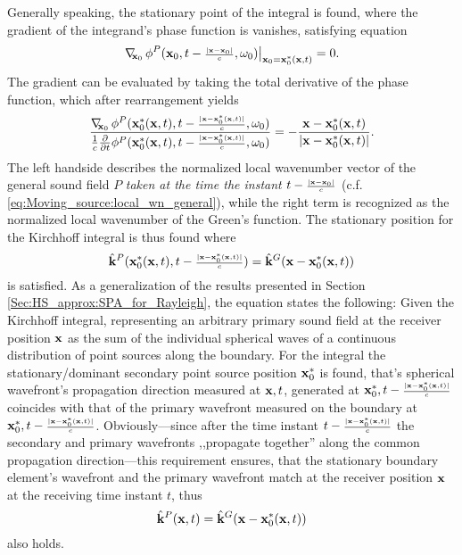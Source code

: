 Generally speaking, the stationary point of the integral is found, where the gradient of the integrand's phase function is vanishes, satisfying equation
\begin{equation}
\left. \nabla_{\!\!\mathbf{x}_0}\, \phi^P(\mathbf{x}_0,t-{\scriptstyle \frac{|\mathbf{x}-\mathbf{x}_0|}{c} },\omega_0) \right|_{\mathbf{x}_0 = \mathbf{x}_0^*(\mathbf{x},t)} = 0.
\end{equation} 
The gradient can be evaluated by taking the total derivative of the phase function, which after rearrangement yields
\begin{equation}
\frac{\nabla_{\!\!\mathbf{x}_0}\, \phi^P(\mathbf{x}_0^*(\mathbf{x},t),t-{\scriptstyle \frac{|\mathbf{x}-\mathbf{x}_0^*(\mathbf{x},t)|}{c} },\omega_0) }{\frac{1}{c}\frac{\partial }{\partial t}\phi^P(\mathbf{x}_0^*(\mathbf{x},t),t-{\scriptstyle \frac{|\mathbf{x}-\mathbf{x}_0^*(\mathbf{x},t)|}{c} },\omega_0) } = - \frac{\mathbf{x}-\mathbf{x}_0^*(\mathbf{x},t)}{|\mathbf{x}-\mathbf{x}_0^*(\mathbf{x},t)|}.
\end{equation}
The left handside describes the normalized local wavenumber vector of the general sound field $P$ \emph{taken at the time the instant $t-{\scriptstyle \frac{|\mathbf{x}-\mathbf{x}_0|}{c} }$} (c.f. \eqref{eq:Moving_source:local_wn_general}), while the right term is recognized as the normalized local wavenumber of the Green's function. 
The stationary position for the Kirchhoff integral is thus found where
\begin{equation}
\label{Eq:moving_sources:moving_point_stat_point_1}
\hat{\mathbf{k}}^P(\mathbf{x}_0^*(\mathbf{x},t),t-{\scriptstyle \frac{|\mathbf{x}-\mathbf{x}_0^*(\mathbf{x},t)|}{c} }) = \hat{\mathbf{k}}^G(\mathbf{x}-\mathbf{x}_0^*(\mathbf{x},t))
\end{equation}
is satisfied.
As a generalization of the results presented in Section \ref{Sec:HS_approx:SPA_for_Rayleigh}, the equation states the following:
Given the Kirchhoff integral, representing an arbitrary primary sound field at the receiver position $\mathbf{x}$ as the sum of the individual spherical waves of a continuous distribution of point sources along the boundary.
For the integral the stationary/dominant secondary point source position $\mathbf{x}_0^*$ is found, that's spherical wavefront's propagation direction measured at $\mathbf{x},t$, generated at $\mathbf{x}_0^*, t-{\scriptstyle \frac{|\mathbf{x}-\mathbf{x}_0^*(\mathbf{x},t)|}{c} }$ coincides with that of the primary wavefront measured on the boundary at $\mathbf{x}_0^*, t-{\scriptstyle \frac{|\mathbf{x}-\mathbf{x}_0^*(\mathbf{x},t)|}{c} }$.
Obviously---since after the time instant $t-{\scriptstyle \frac{|\mathbf{x}-\mathbf{x}_0^*(\mathbf{x},t)|}{c} }$ the secondary and primary wavefronts ,,propagate together'' along the common propagation direction---this requirement ensures, that the stationary boundary element's wavefront and the primary wavefront match at the receiver position $\mathbf{x}$ at the receiving time instant $t$, thus 
\begin{equation}
\hat{\mathbf{k}}^P(\mathbf{x},t) = \hat{\mathbf{k}}^G(\mathbf{x}-\mathbf{x}_0^*(\mathbf{x},t))
\end{equation}
also holds.
%
